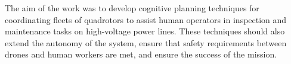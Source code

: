 The aim of the work was to develop cognitive planning techniques for coordinating fleets of quadrotors to assist human operators in inspection and maintenance tasks on high-voltage power lines. These techniques should also extend the autonomy of the system, ensure that safety requirements between drones and human workers are met, and ensure the success of the mission.


